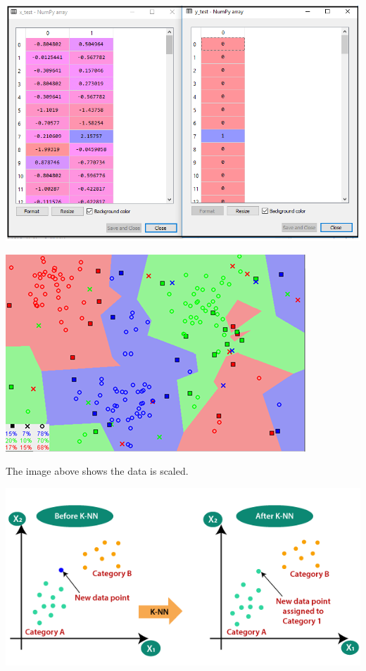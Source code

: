 \documentclass[a4paper,12pt]{report}
\begin{document}
\begin{center}
    \captionsetup{type=figure}
    \includegraphics[width=.9\linewidth]{media/KnearestTest.png}
\end{center}

\begin{center}
    \captionsetup{type=figure}
    \includegraphics[width=.9\linewidth]{media/Knearest.png}
\end{center}

The image above shows the data is scaled.

\begin{center}
    \captionsetup{type=figure}
    \includegraphics[width=.9\linewidth]{media/BeforeAfterKNN.png}
\end{center}
\end{document}
